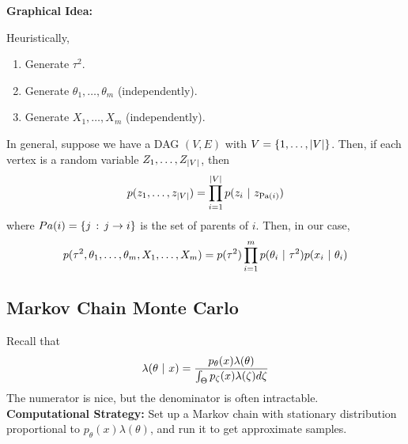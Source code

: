 \textbf{Graphical Idea:}
\begin{center}
\end{center}
Heuristically,
\begin{enumerate}
    \item Generate $\tau^2$.
    \item Generate $\theta_1, \ldots, \theta_m$ (independently).
    \item Generate $X_1, \ldots, X_m$ (independently).
\end{enumerate}

In general, suppose we have a DAG $(V, E)$ with $V = \{1, \ldots, \left\lvert {V} \right\rvert\}$. Then, if each vertex is a random variable $Z_1, \ldots, Z_{\left\lvert {V} \right\rvert}$, then
\[ p(z_1, \ldots, z_{\left\lvert {V} \right\rvert}) = \prod_{i = 1}^{\left\lvert {V} \right\rvert} p(z_i \ |\  z_{\text{Pa}(i)}) \]
where $Pa(i) = \{j \, :\, j \to i\}$ is the set of parents of $i$. Then, in our case,
\[ p(\tau^2, \theta_1, \ldots, \theta_m, X_1, \ldots, X_m) = p(\tau^2)\prod_{i = 1}^{m} p(\theta_i \ |\  \tau^2)p(x_i \ |\  \theta_i) \]

\subsection*{Markov Chain Monte Carlo}
\sectionspace

Recall that
\[ \lambda(\theta \ |\  x) = \frac{p_{\theta}(x)\lambda(\theta)}{\int_{\Theta} p_{\zeta}(x)\lambda(\zeta)d\zeta} \]
The numerator is nice, but the denominator is often intractable.\\

\textbf{Computational Strategy:} Set up a Markov chain with stationary distribution proportional to $p_{\theta}(x)\lambda(\theta)$, and run it to get approximate samples.

